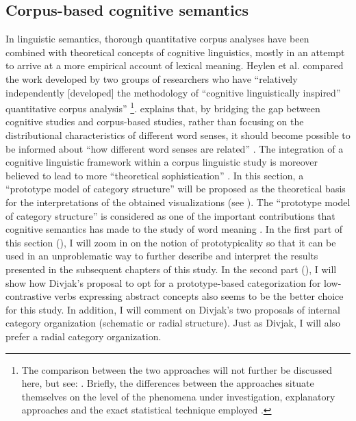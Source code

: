 \subsection{Corpus-based cognitive semantics}
\label{sec:2.4.3}  
In linguistic semantics, thorough quantitative corpus analyses have been combined with theoretical concepts of cognitive linguistics, mostly in an attempt to arrive at a more empirical account of lexical meaning. Heylen et al. compared the work developed by two groups of researchers who have “relatively independently [developed] the methodology of “cognitive linguistically inspired” quantitative corpus analysis” \citep[92]{kristiansen_methodological_2008}\footnote{The comparison between the two approaches will not further be discussed here, but see: \citet{kristiansen_methodological_2008}. Briefly, the differences between the approaches situate themselves on the level of the phenomena under investigation, explanatory approaches and the exact statistical technique employed \citep[92-93]{kristiansen_methodological_2008}.}. \citet{Gries2006b} explains that, by bridging the gap between cognitive studies and corpus-based studies, rather than focusing on the distributional characteristics of different word senses, it should become possible to be informed about “how different word senses are related” \citep[57]{Gries2006b}. The integration of a cognitive linguistic framework within a corpus linguistic study is moreover believed to lead to more “theoretical sophistication” \citep[16]{gilquin_corpus_2010}. In this section, a “prototype model of category structure” will be proposed as the theoretical basis for the interpretations of the obtained visualizations (see ). The “prototype model of category structure” is considered as one of the important contributions that cognitive semantics has made to the study of word meaning \citep[577]{allan_lexical_2013}. In the first part of this section (), I will zoom in on the notion of prototypicality so that it can be used in an unproblematic way to further describe and interpret the results presented in the subsequent chapters of this study. In the second part (), I will show how Divjak’s proposal to opt for a prototype-based categorization for low-contrastive verbs expressing abstract concepts also seems to be the better choice for this study. In addition, I will comment on Divjak’s two proposals of internal category organization (schematic or radial structure). Just as Divjak, I will also prefer a radial category organization.

